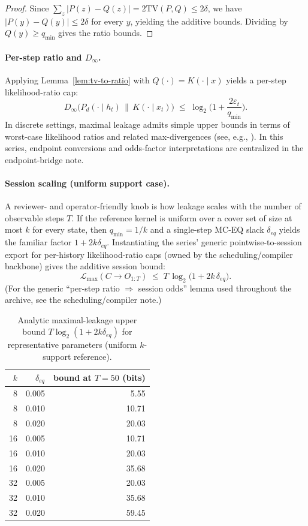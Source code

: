 \documentclass[11pt]{article}
\newcommand{\TV}{\mathrm{TV}}
\newcommand{\eps}{\varepsilon}
\newcommand{\logtwo}{\log_2}
\begin{document}
\begin{proof}
Since $\sum_{z}|P(z)-Q(z)|=2\TV(P,Q)\le 2\delta$, we have $|P(y)-Q(y)|\le 2\delta$ for every $y$, yielding the additive bounds.
Dividing by $Q(y)\ge q_{\min}$ gives the ratio bounds.
\end{proof}

\paragraph{Per-step ratio and $D_\infty$.}
Applying Lemma~\ref{lem:tv-to-ratio} with $Q(\cdot)=K(\cdot\mid x)$ yields a per-step likelihood-ratio cap:
\[
D_\infty\!\big(P_d(\cdot\mid h_t)\,\|\,K(\cdot\mid x_t)\big)\;\le\;\logtwo\!\Big(1+\frac{2\eps_t}{q_{\min}}\Big).
\]
In discrete settings, maximal leakage admits simple upper bounds in terms of worst-case likelihood ratios and related max-divergences (see, e.g., \cite{issa_maxleak}).
In this series, endpoint conversions and odds-factor interpretations are centralized in the endpoint-bridge note.\cite{series:endpointbridge}

\paragraph{Session scaling (uniform support case).}
A reviewer- and operator-friendly knob is how leakage scales with the number of observable steps $T$.
If the reference kernel is uniform over a cover set of size at most $k$ for every state, then $q_{\min}=1/k$ and a single-step MC-EQ slack $\delta_{eq}$ yields the familiar factor $1+2k\delta_{eq}$.
Instantiating the series' generic pointwise-to-session export for per-history likelihood-ratio caps (owned by the scheduling/compiler backbone) gives the additive session bound:
\[
\mathcal{L}_{\max}(C\to O_{1:T}) \;\le\; T\,\log_2\!\Big(1+2k\,\delta_{eq}\Big).
\]
(For the generic ``per-step ratio $\Rightarrow$ session odds'' lemma used throughout the archive, see the scheduling/compiler note.\cite{series:schedcompiler})

\begin{table}[t]
\centering
\small
\begin{tabular}{@{}r r r@{}}
\toprule
$k$ & $\delta_{eq}$ & bound at $T=50$ (bits) \\
\midrule
8 & 0.005 & 5.55 \\
8 & 0.010 & 10.71 \\
8 & 0.020 & 20.03 \\
16 & 0.005 & 10.71 \\
16 & 0.010 & 20.03 \\
16 & 0.020 & 35.68 \\
32 & 0.005 & 20.03 \\
32 & 0.010 & 35.68 \\
32 & 0.020 & 59.45 \\
\bottomrule
\end{tabular}
\caption{Analytic maximal-leakage upper bound $T\log_2(1+2k\delta_{eq})$ for representative parameters (uniform $k$-support reference).}
\label{tab:session-bound}
\end{table}
\end{document}
